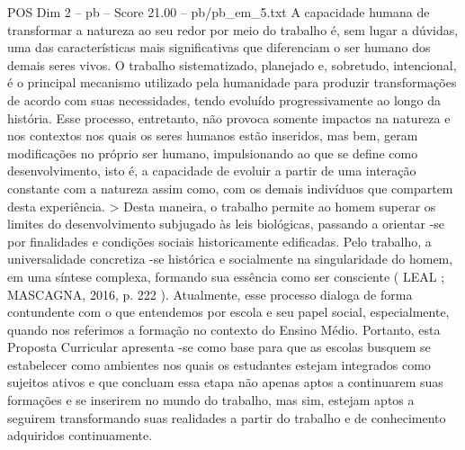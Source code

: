 \begin{textsample}{POS Dim 2 – pb – Score 21.00 – pb/pb\_em\_5.txt}
A capacidade humana de transformar a natureza ao seu redor por meio do trabalho é, sem lugar a dúvidas, uma das características mais significativas que diferenciam o ser humano dos demais seres vivos.
O trabalho sistematizado, planejado e, sobretudo, intencional, é o principal mecanismo utilizado pela humanidade para produzir transformações de acordo com suas necessidades, tendo evoluído progressivamente ao longo da história.
Esse processo, entretanto, não provoca somente impactos na natureza e nos contextos nos quais os seres humanos estão inseridos, mas bem, geram modificações no próprio ser humano, impulsionando ao que se define como desenvolvimento, isto é, a capacidade de evoluir a partir de uma interação constante com a natureza assim como, com os demais indivíduos que compartem desta experiência. > Desta maneira, o trabalho permite ao homem superar os limites do desenvolvimento subjugado às leis biológicas, passando a orientar -se por finalidades e condições sociais historicamente edificadas.
Pelo trabalho, a universalidade concretiza -se histórica e socialmente na singularidade do homem, em uma síntese complexa, formando sua essência como ser consciente ( LEAL ; MASCAGNA, 2016, p. 222 ).
Atualmente, esse processo dialoga de forma contundente com o que entendemos por escola e seu papel social, especialmente, quando nos referimos a formação no contexto do Ensino Médio.
Portanto, esta Proposta Curricular apresenta -se como base para que as escolas busquem se estabelecer como ambientes nos quais os estudantes estejam integrados como sujeitos ativos e que concluam essa etapa não apenas aptos a continuarem suas formações e se inserirem no mundo do trabalho, mas sim, estejam aptos a seguirem transformando suas realidades a partir do trabalho e de conhecimento adquiridos continuamente.

\end{textsample}

